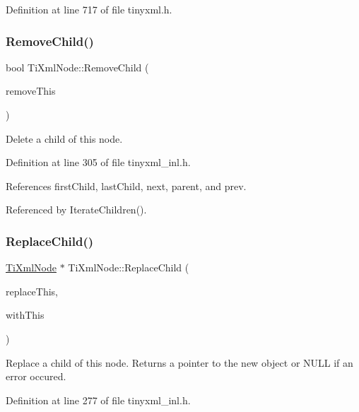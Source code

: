 Definition at line 717 of file tinyxml.\+h.

\hypertarget{class_ti_xml_node_ae19d8510efc90596552f4feeac9a8fbf}{}\label{class_ti_xml_node_ae19d8510efc90596552f4feeac9a8fbf} 
\subsubsection{\texorpdfstring{Remove\+Child()}{RemoveChild()}}
{\footnotesize\ttfamily bool Ti\+Xml\+Node\+::\+Remove\+Child (\begin{DoxyParamCaption}\item[{\hyperlink{class_ti_xml_node}{Ti\+Xml\+Node} $\ast$}]{remove\+This }\end{DoxyParamCaption})}



Delete a child of this node. 



Definition at line 305 of file tinyxml\+\_\+inl.\+h.



References first\+Child, last\+Child, next, parent, and prev.



Referenced by Iterate\+Children().

\hypertarget{class_ti_xml_node_a543208c2c801c84a213529541e904b9f}{}\label{class_ti_xml_node_a543208c2c801c84a213529541e904b9f} 
\subsubsection{\texorpdfstring{Replace\+Child()}{ReplaceChild()}}
{\footnotesize\ttfamily \hyperlink{class_ti_xml_node}{Ti\+Xml\+Node} $\ast$ Ti\+Xml\+Node\+::\+Replace\+Child (\begin{DoxyParamCaption}\item[{\hyperlink{class_ti_xml_node}{Ti\+Xml\+Node} $\ast$}]{replace\+This,  }\item[{const \hyperlink{class_ti_xml_node}{Ti\+Xml\+Node} \&}]{with\+This }\end{DoxyParamCaption})}

Replace a child of this node. Returns a pointer to the new object or N\+U\+LL if an error occured. 

Definition at line 277 of file tinyxml\+\_\+inl.\+h.




